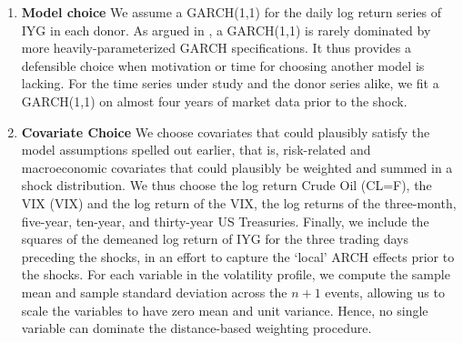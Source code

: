 \documentclass{uiucthesis2021}
\theoremstyle{definition}
\begin{document}
\begin{enumerate}
    \item \textbf{Model choice} We assume a GARCH(1,1) for the daily log return series of IYG in each donor.  As argued in \cite[][]{hansen2005forecast}, a GARCH(1,1) is rarely dominated by more heavily-parameterized GARCH specifications.  It thus provides a defensible choice when motivation or time for choosing another model is lacking.  For the time series under study and the donor series alike, we fit a GARCH(1,1) on almost four years of market data prior to the shock.

    \item \textbf{Covariate Choice} We choose covariates that could plausibly satisfy the model assumptions spelled out earlier, that is, risk-related and macroeconomic covariates that could plausibly be weighted and summed in a shock distribution.  We thus choose the log return Crude Oil (CL=F), the VIX (VIX) and the log return of the VIX, the log returns of the three-month, five-year, ten-year, and thirty-year US Treasuries.  Finally, we include the squares of the demeaned log return of IYG for the three trading days preceding the shocks, in an effort to capture the `local' ARCH effects prior to the shocks.  For each variable in the volatility profile, we compute the sample mean and sample standard deviation across the $n+1$ events, allowing us to scale the variables to have zero mean and unit variance.  Hence, no single variable can dominate the distance-based weighting procedure.


\end{enumerate}
\end{document}
